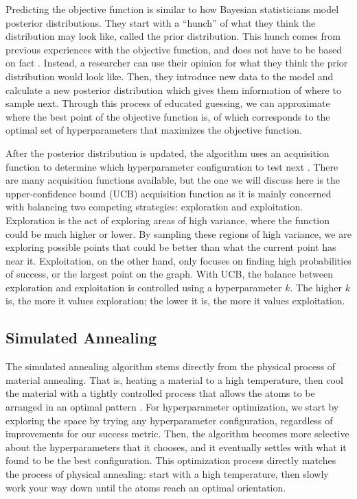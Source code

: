 \documentclass[stu,12pt,floatsintext]{apa7}
\begin{document}
Predicting the objective function is similar to how Bayesian statisticians model posterior distributions. They start with a ``hunch'' of what they think the distribution may look like, called the prior distribution. This hunch comes from previous experiences with the objective function, and does not have to be based on fact \parencite{WU201926}. Instead, a researcher can use their opinion for what they think the prior distribution would look like.  Then, they introduce new data to the model and calculate a new posterior distribution which gives them information of where to sample next. Through this process of educated guessing, we can approximate where the best point of the objective function is, of which corresponds to the optimal set of hyperparameters that maximizes the objective function.

After the posterior distribution is updated, the algorithm uses an acquisition function to determine which hyperparameter configuration to test next \parencite{WU201926}. There are many acquisition functions available, but the one we will discuss here is the upper-confidence bound (UCB) acquisition function as it is mainly concerned with balancing two competing strategies: exploration and exploitation. Exploration is the act of exploring areas of high variance, where the function could be much higher or lower. By sampling these regions of high variance, we are exploring possible points that could be better than what the current point has near it. Exploitation, on the other hand, only focuses on finding high probabilities of success, or the largest point on the graph. With UCB, the balance between exploration and exploitation is controlled using a hyperparameter \(k\). The higher \(k\) is, the more it values exploration; the lower it is, the more it values exploitation.

\subsection{Simulated Annealing}

The simulated annealing algorithm stems directly from the physical process of material annealing. That is, heating a material to a high temperature, then cool the material with a tightly controlled process that allows the atoms to be arranged in an optimal pattern \parencite{rutenbar2002simulated}. For hyperparameter optimization, we start by exploring the space by trying any hyperparameter configuration, regardless of improvements for our success metric. Then, the algorithm becomes more selective about the hyperparameters that it chooses, and it eventually settles with what it found to be the best configuration. This optimization process directly matches the process of physical annealing: start with a high temperature, then slowly work your way down until the atoms reach an optimal orientation. 
\end{document}
